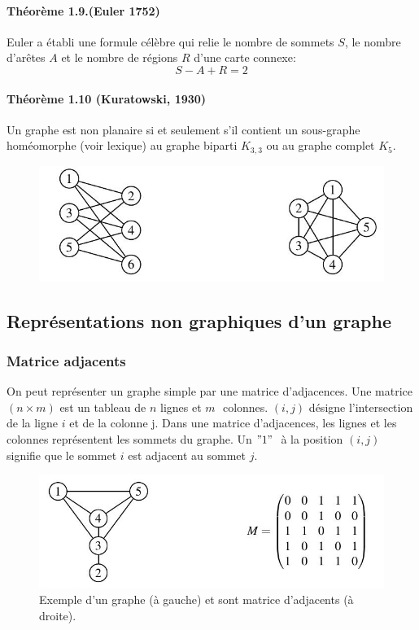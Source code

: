 \paragraph*{Théorème 1.9.(Euler 1752)}
Euler a établi une formule célèbre qui relie le nombre de sommets $ S $, le nombre
d'arêtes $ A $ et le nombre de régions $ R $ d'une carte connexe:
$$ S-A+R=2 $$

\paragraph*{Théorème 1.10 (Kuratowski, 1930)}Un graphe est non planaire si et seulement s'il contient 
un sous-graphe homéomorphe (voir lexique) au graphe biparti $ K_{3,3} $ ou au graphe complet $ K_{5} $.

\begin{figure}[h]
\centering
\includegraphics[width=0.7\linewidth]{images/graph11}
\label{fig:graph11}
\end{figure}

\newpage
\subsection{Représentations non graphiques d'un graphe}
\subsubsection{Matrice adjacents}
\noindent On peut représenter un graphe simple par une matrice d'adjacences. Une matrice $ (n\times m) $
est un tableau de $ n $ lignes et $ m$  $ $ colonnes. $(i, j)$ désigne l'intersection de la ligne $ i$ et de
la colonne j. Dans une matrice d'adjacences, les lignes et les colonnes représentent les
sommets du graphe. Un $ "1" $  $ $ à la position $ (i, j) $ signifie que le sommet $ i $ est adjacent au
sommet $ j $.

\begin{figure}[h]
\centering
\includegraphics[width=0.7\linewidth]{images/graph7}
\caption[Exemple d'un graphe (à gauche) et sont matrice d'adjacents (à droite).]{Exemple d'un graphe (à gauche) et sont matrice d'adjacents (à droite).}
\label{fig:graph7}
\end{figure}
